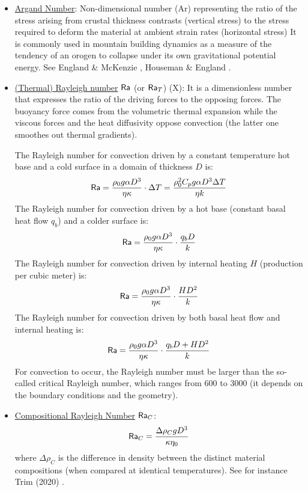 \begin{itemize}
\item \underline{Argand Number}: 
Non-dimensional number (Ar) representing the ratio of the stress arising 
from crustal thickness
contrasts (vertical stress) to the stress required to deform
the material at ambient strain rates (horizontal stress)
It is commonly used in mountain building
dynamics as a measure of the tendency of an orogen to
collapse under its own gravitational potential energy.
See England \& McKenzie \cite{enmc82}, Houseman \& England \cite{hoen86a}.

\item \underline{(Thermal) Rayleigh number} ${\mathsf{Ra}}$ (or ${\mathsf{Ra}}_T$) (X): 
It is a dimensionless number that expresses the	ratio of the driving forces to the opposing forces.
The buoyancy force comes from the volumetric thermal expansion while the viscous forces and 
the heat diffusivity oppose convection (the latter one smoothes out thermal gradients). 

The Rayleigh number for convection driven by a constant temperature hot base and a cold surface
in a domain of thickness $D$ is:
\[
{\mathsf{Ra}} 
= \frac{\rho_0 g \alpha D^3 }{\eta \kappa}  \cdot  \Delta T
= \frac{\rho_0^2 C_p g \alpha D^3 \Delta T}{\eta k}
\]
The Rayleigh number for convection driven by a hot base (constant basal heat flow $q_b$)
and a colder surface is:
\[
{\mathsf{Ra}} = \frac{\rho_0 g \alpha D^3}{\eta \kappa } \cdot  \frac{q_b D}{k}
\]  
The Rayleigh number for convection driven by internal heating $H$ (production per cubic meter) is:
\[
{\mathsf{Ra}} = \frac{\rho_0 g \alpha D^3}{\eta \kappa} \cdot  \frac{H D^2}{k }
\]
The Rayleigh number for convection driven by both basal heat flow and internal heating is:	
\[
{\mathsf{Ra}} = \frac{\rho_0 g \alpha D^3}{\eta \kappa} \cdot  \frac{q_b D + H D^2}{k }
\]
For convection to occur, the Rayleigh number must be larger than the so-called critical 
Rayleigh number, which ranges from 600 to 3000 (it depends on the boundary conditions and the 
geometry).

\item \underline{Compositional Rayleigh Number} ${\mathsf{Ra}}_C$:  
\[
{\mathsf{Ra}}_C= \frac{\Delta \rho_C  g  D^3}{\kappa \eta_0}
\]
where $\Delta \rho_C$ is the difference in density between the distinct material compositions
(when compared at identical temperatures). See for instance Trim \etal (2020) \cite{trlb20}.


\end{itemize}
